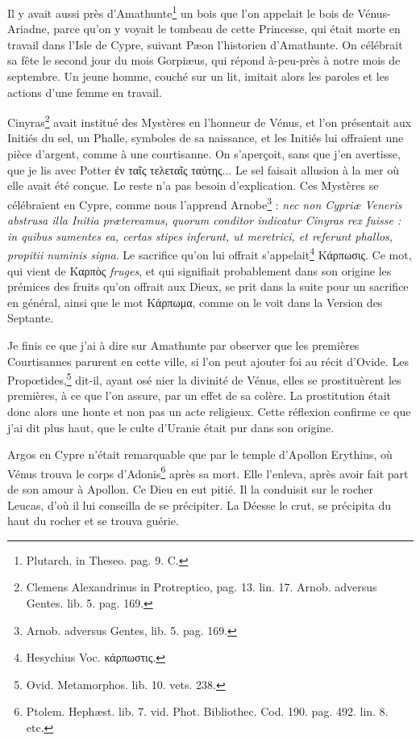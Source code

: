 \documentclass[a4paper, 11pt, oneside, polutonikogreek, french]{article}
\begin{document}
Il y avait aussi près d'Amathunte\footnote{Plutarch. in Theseo. pag. 9. C.} un bois que l'on appelait le bois de Vénus-Ariadne, parce qu'on y voyait le tombeau de cette Princesse, qui était morte en travail dans l'Isle de Cypre, suivant Pæon l'historien d'Amathunte. On célébrait sa fête le second jour du mois Gorpiæus, qui répond à-peu-près à notre mois de septembre. Un jeune homme, couché sur un lit, imitait alors les paroles et les actions d'une femme en travail.

Cinyras\footnote{Clemens Alexandrinus in Protreptico, pag. 13. lin. 17. Arnob. adversus Gentes. lib. 5. pag. 169.} avait institué des Mystères en l'honneur de Vénus, et l'on présentait aux Initiés du sel, un Phalle, symboles de sa naissance, et les Initiés lui offraient une pièce d'argent, comme à une courtisanne. On s'aperçoit, sans que j'en avertisse, que je lis avec Potter ἐν ταῖς τελεταῖς ταύτης... Le sel faisait allusion à la mer où elle avait été conçue. Le reste n'a pas besoin d'explication. Ces Mystères se célébraient en Cypre, comme nous l'apprend Arnobe\footnote{Arnob. adversus Gentes, lib. 5. pag. 169.} : \emph{nec non Cypriæ Veneris abstrusa illa Initia prætereamus, quorum conditor indicatur Cinyras rex fuisse : in quibus sumentes ea, certas stipes inferunt, ut meretrici, et referunt phallos, propitii numinis signa}. Le sacrifice qu'on lui offrait s'appelait\footnote{Hesychius Voc. κάρπωστις.} Κάρπωσις. Ce mot, qui vient de Καρπὸς \emph{fruges}, et qui signifiait probablement dans son origine les prémices des fruits qu'on offrait aux Dieux, se prit dans la suite pour un sacrifice en général, ainsi que le mot Κάρπωμα, comme on le voit dans la Version des Septante.

Je finis ce que j'ai à dire sur Amathunte par observer que les premières Courtisannes parurent en cette ville, si l'on peut ajouter foi au récit d'Ovide. Les Propœtides,\footnote{Ovid. Metamorphos. lib. 10. vets. 238.} dit-il, ayant osé nier la divinité de Vénus, elles se prostituèrent les premières, à ce que l'on assure, par un effet de sa colère. La prostitution était donc alors une honte et non pas un acte religieux. Cette réflexion confirme ce que j'ai dit plus haut, que le culte d'Uranie était pur dans son origine.

Argos en Cypre n'était remarquable que par le temple d'Apollon Erythius, où Vénus trouva le corps d'Adonis\footnote{Ptolem. Hephæst. lib. 7. vid. Phot. Bibliothec. Cod. 190. pag. 492. lin. 8. etc.} après sa mort. Elle l'enleva, après avoir fait part de son amour à Apollon. Ce Dieu en eut pitié. Il la conduisit sur le rocher Leucas, d'où il lui conseilla de se précipiter. La Déesse le crut, se précipita du haut du rocher et se trouva guérie.
\end{document}
